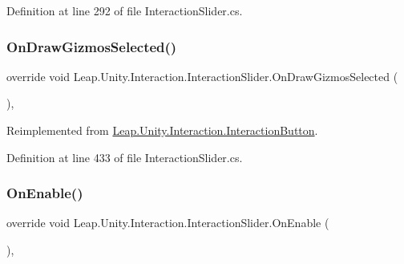 Definition at line 292 of file Interaction\+Slider.\+cs.

\mbox{\label{class_leap_1_1_unity_1_1_interaction_1_1_interaction_slider_a231a11f6e3fdd351816de72c016a9b19}} 
\subsubsection{\texorpdfstring{OnDrawGizmosSelected()}{OnDrawGizmosSelected()}}
{\footnotesize\ttfamily override void Leap.\+Unity.\+Interaction.\+Interaction\+Slider.\+On\+Draw\+Gizmos\+Selected (\begin{DoxyParamCaption}{ }\end{DoxyParamCaption})\hspace{0.3cm}{\ttfamily [protected]}, {\ttfamily [virtual]}}



Reimplemented from \mbox{\hyperlink{class_leap_1_1_unity_1_1_interaction_1_1_interaction_button_a3cf601cd070b0d92bda43ed675d2f367}{Leap.\+Unity.\+Interaction.\+Interaction\+Button}}.



Definition at line 433 of file Interaction\+Slider.\+cs.

\mbox{\label{class_leap_1_1_unity_1_1_interaction_1_1_interaction_slider_a0477f252b1bc1fe7a736b87624a0d951}} 
\subsubsection{\texorpdfstring{OnEnable()}{OnEnable()}}
{\footnotesize\ttfamily override void Leap.\+Unity.\+Interaction.\+Interaction\+Slider.\+On\+Enable (\begin{DoxyParamCaption}{ }\end{DoxyParamCaption})\hspace{0.3cm}{\ttfamily [protected]}, {\ttfamily [virtual]}}



